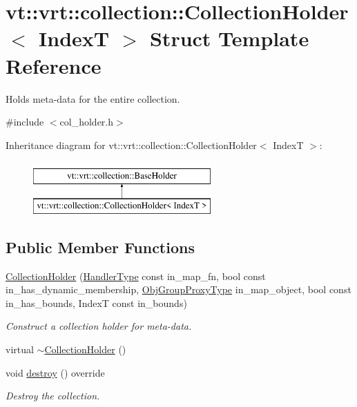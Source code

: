 \hypertarget{structvt_1_1vrt_1_1collection_1_1_collection_holder}{}\section{vt\+:\+:vrt\+:\+:collection\+:\+:Collection\+Holder$<$ IndexT $>$ Struct Template Reference}
\label{structvt_1_1vrt_1_1collection_1_1_collection_holder}


Holds meta-\/data for the entire collection.  




{\ttfamily \#include $<$col\+\_\+holder.\+h$>$}

Inheritance diagram for vt\+:\+:vrt\+:\+:collection\+:\+:Collection\+Holder$<$ IndexT $>$\+:\begin{figure}[H]
\begin{center}
\leavevmode
\includegraphics[height=2.000000cm]{structvt_1_1vrt_1_1collection_1_1_collection_holder}
\end{center}
\end{figure}
\subsection*{Public Member Functions}
\begin{DoxyCompactItemize}
\item 
\hyperlink{structvt_1_1vrt_1_1collection_1_1_collection_holder_a4e431e6846e0043c02c74161f8fcd1cf}{Collection\+Holder} (\hyperlink{namespacevt_af64846b57dfcaf104da3ef6967917573}{Handler\+Type} const in\+\_\+map\+\_\+fn, bool const in\+\_\+has\+\_\+dynamic\+\_\+membership, \hyperlink{namespacevt_ad7cae989df485fccca57f0792a880a8e}{Obj\+Group\+Proxy\+Type} in\+\_\+map\+\_\+object, bool const in\+\_\+has\+\_\+bounds, IndexT const in\+\_\+bounds)
\begin{DoxyCompactList}\small\item\em Construct a collection holder for meta-\/data. \end{DoxyCompactList}\item 
virtual \hyperlink{structvt_1_1vrt_1_1collection_1_1_collection_holder_a01b3cf95992bb56c40fa926611b41288}{$\sim$\+Collection\+Holder} ()
\item 
void \hyperlink{structvt_1_1vrt_1_1collection_1_1_collection_holder_a00a325a6c9c321d00b6b6eb0fdfbfb9f}{destroy} () override
\begin{DoxyCompactList}\small\item\em Destroy the collection. \end{DoxyCompactList}\end{DoxyCompactItemize}

